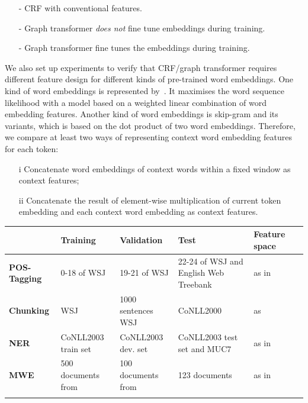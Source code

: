 \documentclass[11pt]{article}
\begin{document}
\begin{small}
\begin{itemize}
\item[-] CRF with conventional features.
\item[-] Graph transformer \textit{does not} fine tune embeddings during training.
\item[-] Graph transformer fine tunes the embeddings during training.
\end{itemize}
\end{small}

We also set up experiments to verify that CRF/graph transformer requires different feature design for different kinds of pre-trained word embeddings. One kind of word embeddings is represented by~\cite{bengio2006neural}. It maximises the word sequence likelihood with a model based on a weighted linear combination of word embedding features. Another kind of word embeddings is skip-gram and its variants, which is based on the dot product of two word embeddings. Therefore, we compare at least two ways of representing context word embedding features for each token:

\begin{small}
\begin{itemize}
\item[i] Concatenate word embeddings of context words within a fixed window as context features; 
\item[ii] Concatenate the result of element-wise multiplication of current token embedding and each context word embedding as context features. 
\end{itemize}
\end{small}



\begin{table}
\begin{small}
\begin{tabular}{lllp{3cm}ll}
\hline
			& \textbf{Training} & \textbf{Validation} & \textbf{Test} & \textbf{Feature space} \\ \hline
\textbf{POS-Tagging} & 0-18 of WSJ & 19-21 of WSJ & 22-24 of WSJ and English Web Treebank & as in~\cite{collobert2011natural} \\
\textbf{Chunking} & WSJ & 1000 sentences WSJ & CoNLL2000 & as~\cite{turian2010word}\\
\textbf{NER} & CoNLL2003 train set & CoNLL2003 dev. set & CoNLL2003 test set and MUC7 & as in~\cite{turian2010word} \\
\textbf{MWE} & 500 documents from & 100 documents from & 123 documents & as in~\cite{mwecorpus}\\
\hline
\label{datasplit}
\end{tabular}
\end{small}
\end{table}
\end{document}
